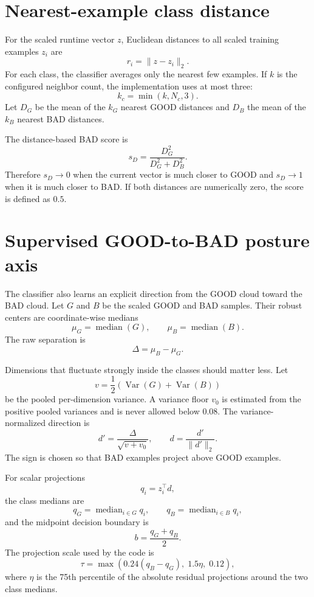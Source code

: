 \documentclass[11pt,a4paper]{article}
\begin{document}
\section{Nearest-example class distance}

For the scaled runtime vector $z$, Euclidean distances to all scaled training
examples $z_i$ are
\[
r_i=\lVert z-z_i\rVert_2.
\]
For each class, the classifier averages only the nearest few examples. If $k$
is the configured neighbor count, the implementation uses at most three:
\[
k_c=\min(k,N_c,3).
\]
Let $D_G$ be the mean of the $k_G$ nearest GOOD distances and $D_B$ the mean of
the $k_B$ nearest BAD distances.

The distance-based BAD score is
\[
s_D=
\frac{D_G^2}{D_G^2+D_B^2}.
\]
Therefore $s_D\rightarrow 0$ when the current vector is much closer to GOOD and
$s_D\rightarrow 1$ when it is much closer to BAD. If both distances are
numerically zero, the score is defined as $0.5$.

\section{Supervised GOOD-to-BAD posture axis}

The classifier also learns an explicit direction from the GOOD cloud toward the
BAD cloud. Let $G$ and $B$ be the scaled GOOD and BAD samples. Their robust
centers are coordinate-wise medians
\[
\mu_G=\operatorname{median}(G),\qquad
\mu_B=\operatorname{median}(B).
\]
The raw separation is
\[
\Delta=\mu_B-\mu_G.
\]

Dimensions that fluctuate strongly inside the classes should matter less. Let
\[
v=\frac{1}{2}\left(\operatorname{Var}(G)+\operatorname{Var}(B)\right)
\]
be the pooled per-dimension variance. A variance floor $v_0$ is estimated from
the positive pooled variances and is never allowed below $0.08$. The
variance-normalized direction is
\[
d' = \frac{\Delta}{\sqrt{v+v_0}},
\qquad
 d=\frac{d'}{\lVert d'\rVert_2}.
\]
The sign is chosen so that BAD examples project above GOOD examples.

For scalar projections
\[
q_i=z_i^\top d,
\]
the class medians are
\[
q_G=\operatorname{median}_{i\in G}q_i,
\qquad
q_B=\operatorname{median}_{i\in B}q_i,
\]
and the midpoint decision boundary is
\[
b=\frac{q_G+q_B}{2}.
\]
The projection scale used by the code is
\[
\tau=\max\left(0.24(q_B-q_G),\;1.5\eta,\;0.12\right),
\]
where $\eta$ is the 75th percentile of the absolute residual projections around
the two class medians.
\end{document}
